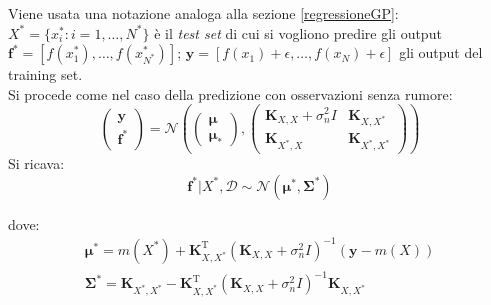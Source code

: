 \newpage

Viene usata una notazione analoga alla sezione \ref{regressioneGP}: $X^*=\{x_i^*:i=1,\dots,N^*\}$ è il \textit{test set} di cui si vogliono predire gli output $\bm{f^*}=\left[f(x^*_1), \dots, f(x^*_{N^*}) \right]$;  $\bm{y}=\left[f(x_1)+\epsilon, \dots, f(x_N)+\epsilon \right]$ gli output del training set. \\
Si procede come nel caso della predizione con osservazioni senza rumore:
\[
\begin{pmatrix}
\bm{y}\\
\bm{f^*}
\end{pmatrix}
=
\mathcal{N}\left(
\begin{pmatrix}
\bm{\mu}\\
\bm{\mu_*}
\end{pmatrix},
\begin{pmatrix}
\bm{K}_{X,X}+\sigma_n^2I & \bm{K}_{X,X^*}\\
\bm{K}_{X^*,X} & \bm{K}_{X^*,X^*}
\end{pmatrix}
\right)
\]
Si ricava:
\[
\bm{f^*} | X^*, \mathcal{D} \sim \mathcal{N}(\bm{\mu^*}, \bm{\Sigma^*})
\]

dove: 
\[
\begin{split}
\bm{\mu^*}=m(X^*)+\bm{K}_{X,X^*}^\text{T}(\bm{K}_{X,X}+\sigma_n^2I)^{-1}(\bm{y}-m(X))\\
\bm{\Sigma^*}=\bm{K}_{X^*,X^*}-\bm{K}_{X,X^*}^\text{T}(\bm{K}_{X,X}+\sigma_n^2I)^{-1}\bm{K}_{X,X^*}
\end{split}
\]


